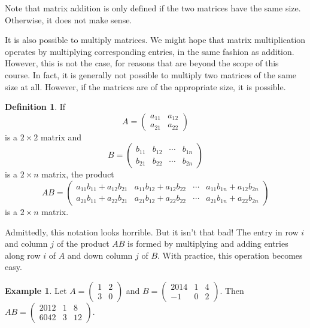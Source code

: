 \documentclass{book}
\theoremstyle{plain}
\theoremstyle{definition}
\newtheorem{definition}[theorem]{Definition}
\newtheorem{example}[theorem]{Example}
\begin{document}
Note that matrix addition is only defined if the two matrices have the same size. Otherwise, it does not make sense.

It is also possible to multiply matrices. We might hope that matrix multiplication operates by multiplying corresponding entries, in the same fashion as addition. However, this is not the case, for reasons that are beyond the scope of this course. In fact, it is generally not possible to multiply two matrices of the same size at all. However, if the matrices are of the appropriate size, it is possible.

\begin{definition}
If $$A = \begin{pmatrix} a_{11} & a_{12} \\ a_{21} & a_{22} \end{pmatrix}$$ is a $2 \times 2$ matrix and $$B = \begin{pmatrix} b_{11} & b_{12} & \cdots & b_{1n} \\ b_{21} & b_{22} & \cdots & b_{2n} \end{pmatrix}$$ is a $2 \times n$ matrix, the product $$AB = \begin{pmatrix} a_{11}b_{11} + a_{12}b_{21} & a_{11}b_{12} + a_{12}b_{22} & \cdots & a_{11}b_{1n} + a_{12}b_{2n} \\ a_{21}b_{11} + a_{22}b_{21} & a_{21}b_{12} + a_{22}b_{22} & \cdots & a_{21}b_{1n} + a_{22}b_{2n} \end{pmatrix}$$ is a $2 \times n$ matrix.
\end{definition}

Admittedly, this notation looks horrible. But it isn't that bad! The entry in row $i$ and column $j$ of the product $AB$ is formed by multiplying and adding entries along row $i$ of $A$ and down column $j$ of $B$. With practice, this operation becomes easy.

\begin{example}
Let $A = \begin{pmatrix} 1 & 2 \\ 3 & 0 \end{pmatrix}$ and $B = \begin{pmatrix} 2014 & 1 & 4 \\ -1 & 0 & 2 \end{pmatrix}$. Then $AB = \begin{pmatrix} 2012 & 1 & 8 \\ 6042 & 3 & 12 \end{pmatrix}$.
\end{example}
\end{document}
